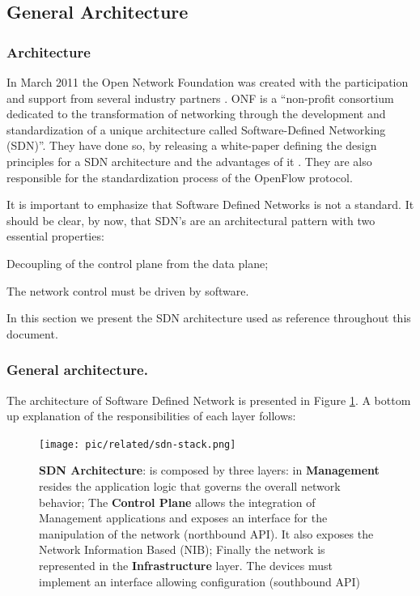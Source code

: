 \subsection{General Architecture}

\subsubsection{Architecture}
In March 2011 the Open Network Foundation was created with the
participation and support from several industry partners \cite{onf}. ONF  is a ``non-profit consortium
dedicated to the transformation of networking through the development
and standardization of a unique architecture called Software-Defined
Networking (SDN)''. They have done so, by releasing a white-paper
defining the design principles for a SDN architecture and the
advantages of it \cite{ONF:2012ui}. They are also responsible for the standardization
process of the OpenFlow protocol.

It is important to emphasize that Software Defined Networks is not a
standard. It should be
clear, by now, that SDN's are an architectural pattern with two
essential properties:

\begin{itemize*}
\item Decoupling of the control plane from the data plane;
\item The network control must be driven by software.
\end{itemize*}

In this section we present the SDN architecture used as reference throughout this document.  

\subsubsection{General architecture.} The architecture of Software Defined Network is presented in Figure
\ref{fig:sdn-stack}. A bottom up explanation of the responsibilities of
each layer follows:

\begin{figure}
  \centering 
  \footnotesize
  \texttt{[image: pic/related/sdn-stack.png]}
  \caption[SDN Architecture]{\textbf{SDN Architecture}: is composed by three
    layers: in \textbf{Management} resides the application
    logic that governs the overall network behavior; The
    \textbf{Control Plane}   allows the integration
    of  Management applications and exposes an interface for the
    manipulation of the network (northbound API). It also exposes the Network
    Information Based (NIB); Finally the network is
    represented in the \textbf{Infrastructure} layer. The devices must
  implement an interface allowing configuration (southbound API)}
  \label{fig:sdn-stack}
\end{figure}

